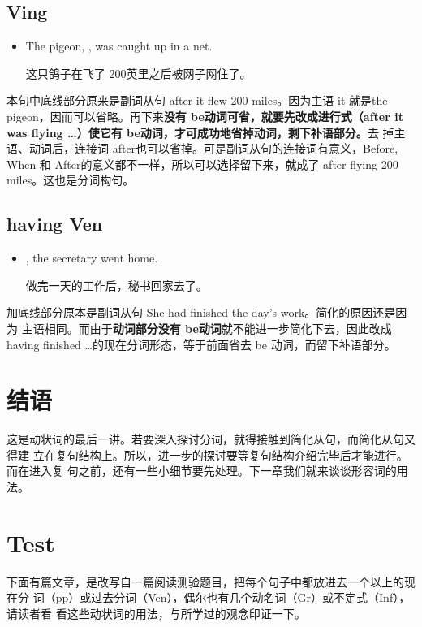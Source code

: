 \subsection{Ving}

\begin{itemize}
\item The pigeon, , was caught up in a net.

  这只鸽子在飞了 200英里之后被网子网住了。
\end{itemize}

本句中底线部分原来是副词从句 after it flew 200 miles。因为主语 it 就是the
pigeon，因而可以省略。再下来\textbf{没有 be动词可省，就要先改成进行式（after
  it was flying \ldots）使它有 be动词，才可成功地省掉动词，剩下补语部分。}去
掉主语、动词后，连接词 after也可以省掉。可是副词从句的连接词有意义，Before,
When 和 After的意义都不一样，所以可以选择留下来，就成了 after flying 200
miles。这也是分词构句。

\subsection{having Ven}

\begin{itemize}
\item {}, the secretary went home.

  做完一天的工作后，秘书回家去了。
\end{itemize}

加底线部分原本是副词从句 She had finished the day's work。简化的原因还是因为
主语相同。而由于\textbf{动词部分没有 be动词}就不能进一步简化下去，因此改成 having
finished \ldots{}的现在分词形态，等于前面省去 be 动词，而留下补语部分。

\section{结语}

这是动状词的最后一讲。若要深入探讨分词，就得接触到简化从句，而简化从句又得建
立在复句结构上。所以，进一步的探讨要等复句结构介绍完毕后才能进行。而在进入复
句之前，还有一些小细节要先处理。下一章我们就来谈谈形容词的用法。

\section{Test}

下面有篇文章，是改写自一篇阅读测验题目，把每个句子中都放进去一个以上的现在分
词（pp）或过去分词（Ven），偶尔也有几个动名词（Gr）或不定式（Inf），请读者看
看这些动状词的用法，与所学过的观念印证一下。

